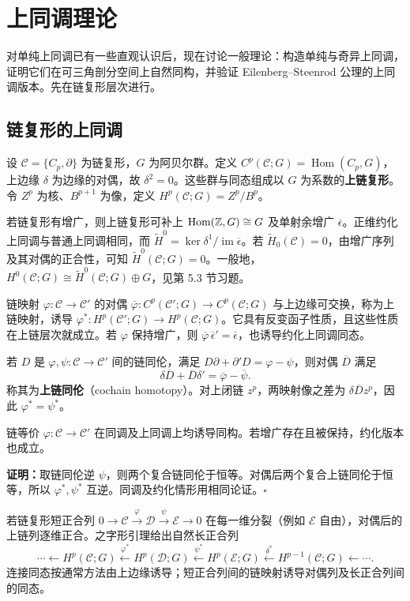 \section{上同调理论}
对单纯上同调已有一些直观认识后，现在讨论一般理论：构造单纯与奇异上同调，证明它们在可三角剖分空间上自然同构，并验证 Eilenberg--Steenrod 公理的上同调版本。先在链复形层次进行。

\subsection*{链复形的上同调}
设 $\mathcal C=\{C_p,\partial\}$ 为链复形，$G$ 为阿贝尔群。定义 $C^p(\mathcal C;G)=\operatorname{Hom}(C_p,G)$，上边缘 $\delta$ 为边缘的对偶，故 $\delta^2=0$。这些群与同态组成以 $G$ 为系数的\textbf{上链复形}。令 $Z^p$ 为核、$B^{p+1}$ 为像，定义 $H^p(\mathcal C;G)=Z^p/B^p$。

若链复形有增广，则上链复形可补上 $\operatorname{Hom}(\mathbb{Z},G)\cong G$ 及单射余增广 $\overline\epsilon$。正维约化上同调与普通上同调相同，而 $\widetilde H^0=\ker\delta^1/\operatorname{im}\overline\epsilon$。若 $\widetilde H_0(\mathcal C)=0$，由增广序列及其对偶的正合性，可知 $\widetilde H^0(\mathcal C;G)=0$。一般地，$H^0(\mathcal C;G)\cong\widetilde H^0(\mathcal C;G)\oplus G$，见第 5.3 节习题。

链映射 $\varphi:\mathcal C\to\mathcal C'$ 的对偶 $\overline\varphi:C^p(\mathcal C';G)\to C^p(\mathcal C;G)$ 与上边缘可交换，称为上链映射，诱导 $\varphi^*:H^p(\mathcal C';G)\to H^p(\mathcal C;G)$。它具有反变函子性质，且这些性质在上链层次就成立。若 $\varphi$ 保持增广，则 $\overline\varphi\,\overline\epsilon'=\overline\epsilon$，也诱导约化上同调同态。

若 $D$ 是 $\varphi,\psi:\mathcal C\to\mathcal C'$ 间的链同伦，满足 $D\partial+\partial'D=\varphi-\psi$，则对偶 $\overline D$ 满足
\[
\delta\overline D+\overline D\delta'=\overline\varphi-\overline\psi.
\]
称其为\textbf{上链同伦}（cochain homotopy）。对上闭链 $z^p$，两映射像之差为 $\delta\overline Dz^p$，因此 $\varphi^*=\psi^*$。

链等价 $\varphi:\mathcal C\to\mathcal C'$ 在同调及上同调上均诱导同构。若增广存在且被保持，约化版本也成立。

\textbf{证明：}取链同伦逆 $\psi$，则两个复合链同伦于恒等。对偶后两个复合上链同伦于恒等，所以 $\varphi^*,\psi^*$ 互逆。同调及约化情形用相同论证。\hfill$\square$

若链复形短正合列 $0\to\mathcal C\xrightarrow{\varphi}\mathcal D\xrightarrow{\psi}\mathcal E\to0$ 在每一维分裂（例如 $\mathcal E$ 自由），对偶后的上链列逐维正合。之字形引理给出自然长正合列
\[
\cdots\leftarrow H^p(\mathcal C;G)\xleftarrow{\varphi^*}H^p(\mathcal D;G)
\xleftarrow{\psi^*}H^p(\mathcal E;G)\xleftarrow{\delta^*}H^{p-1}(\mathcal C;G)\leftarrow\cdots.
\]
连接同态按通常方法由上边缘诱导；短正合列间的链映射诱导对偶列及长正合列间的同态。

